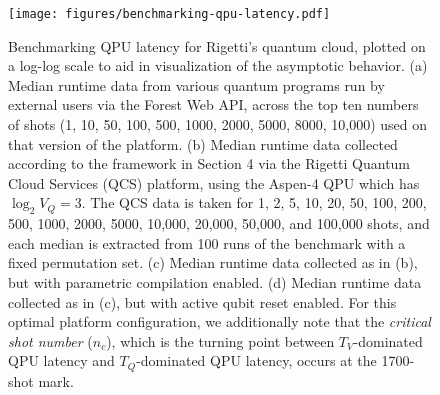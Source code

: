 \documentclass[12pt]{iopart}
\begin{document}
\begin{figure}
    \centering
    \texttt{[image: figures/benchmarking-qpu-latency.pdf]}
    \caption{
    Benchmarking QPU latency for Rigetti's quantum cloud, plotted on a log-log scale to aid in visualization of the asymptotic behavior.
    (a) Median runtime data from various quantum programs run by external users via the Forest Web API, across the top ten numbers of shots (1, 10, 50, 100, 500, 1000, 2000, 5000, 8000, 10,000) used on that version of the platform.
    (b) Median runtime data collected according to the framework in Section 4 via the Rigetti Quantum Cloud Services (QCS) platform, using the Aspen-4 QPU which has $\log_{2}{V_Q} = 3$. The QCS data is taken for 1, 2, 5, 10, 20, 50, 100, 200, 500, 1000, 2000, 5000, 10,000, 20,000, 50,000, and 100,000 shots, and each median is extracted from 100 runs of the benchmark with a fixed permutation set. (c) Median runtime data collected as in (b), but with parametric compilation enabled.
    (d) Median runtime data collected as in (c), but with active qubit reset enabled. For this optimal platform configuration, we additionally note that the \textit{critical shot number} ($n_c$), which is the
    turning point between $T_V$-dominated QPU latency and $T_Q$-dominated QPU latency, occurs at the 1700-shot mark.}
    \label{fig:QPU-Latency}
\end{figure}
\end{document}
